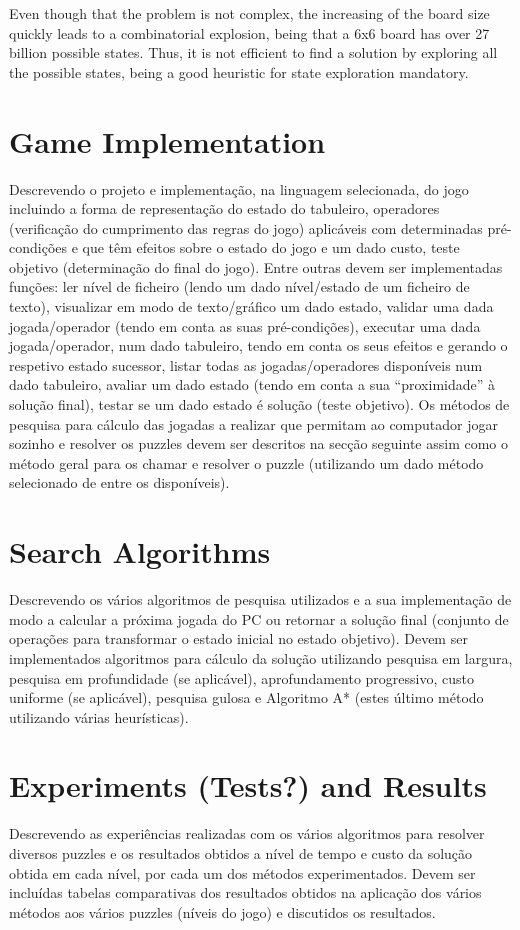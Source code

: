 \documentclass[conference]{IEEEtran}
\begin{document}
Even though that the problem is not complex, the increasing of the board size quickly leads to a combinatorial explosion, being that a 6x6 board has over 27 billion possible states. Thus, it is not efficient to find a solution by exploring all the possible states, being a good heuristic for state exploration mandatory.

\section{Game Implementation}
Descrevendo o projeto e implementação, na linguagem selecionada, do jogo incluindo a forma de representação do estado do tabuleiro, operadores (verificação do cumprimento das regras do jogo) aplicáveis com determinadas pré-condições e que têm efeitos sobre o estado do jogo e um dado custo, teste objetivo (determinação do final do jogo). Entre outras devem ser implementadas funções: ler nível de ficheiro (lendo um dado nível/estado de um ficheiro de texto), visualizar em modo de texto/gráfico um dado estado, validar uma dada jogada/operador (tendo em conta as suas pré-condições), executar uma dada jogada/operador, num dado tabuleiro, tendo em conta os seus efeitos e gerando o respetivo estado sucessor, listar todas as jogadas/operadores disponíveis num dado tabuleiro, avaliar um dado estado (tendo em conta a sua “proximidade” à solução final), testar se um dado estado é solução (teste objetivo). Os métodos de pesquisa para cálculo das jogadas a realizar que permitam ao computador jogar sozinho e resolver os puzzles devem ser descritos na secção seguinte assim como o método geral para os chamar e resolver o puzzle (utilizando um dado método selecionado de entre os disponíveis).

\section{Search Algorithms}
Descrevendo os vários algoritmos de pesquisa utilizados e a sua implementação de modo a calcular a próxima jogada do PC ou retornar a solução final (conjunto de operações para transformar o estado inicial no estado objetivo). Devem ser implementados algoritmos para cálculo da solução utilizando pesquisa em largura, pesquisa em profundidade (se aplicável), aprofundamento progressivo, custo uniforme (se aplicável), pesquisa gulosa e Algoritmo A* (estes último método utilizando várias heurísticas).

\section{Experiments (Tests?) and Results}
Descrevendo as experiências realizadas com os vários algoritmos para resolver diversos puzzles e os resultados obtidos a nível de tempo e custo da solução obtida em cada nível, por cada um dos métodos experimentados. Devem ser incluídas tabelas comparativas dos resultados obtidos na aplicação dos vários métodos aos vários puzzles (níveis do jogo) e discutidos os resultados.
\end{document}
